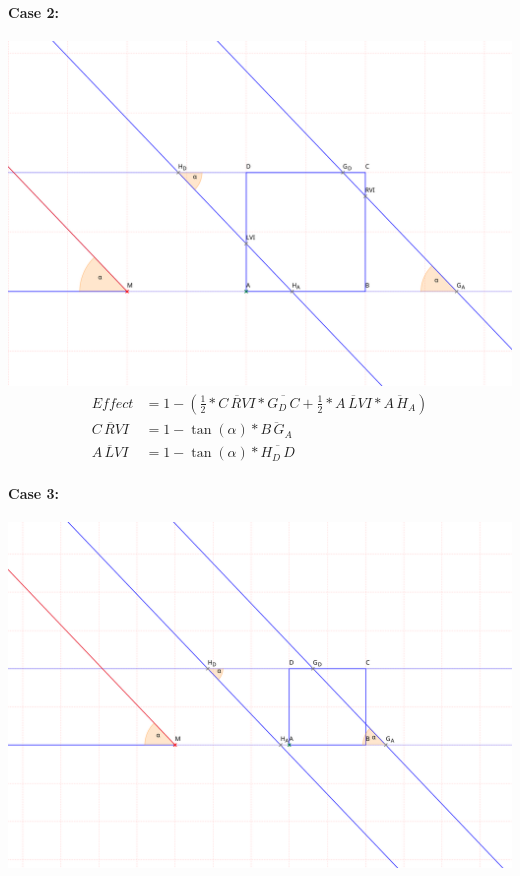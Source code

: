 \documentclass[a4paper,10pt,fleqn]{scrartcl}
\begin{document}
\paragraph{Case 2:}
\includegraphics[width=\textwidth]{case2}
\begin{align*}
Effect &= 1 - (\frac{1}{2} * \overline{C\,RVI} * \overline{G_D\,C} + \frac{1}{2} * \overline{A\,LVI} * \overline{A\,H_A})\\
\overline{C\,RVI} &=  1 - \tan(\alpha) * \overline{B\,G_A}\\
\overline{A\,LVI} &=  1 - \tan(\alpha) * \overline{H_D\,D}
\end{align*}
\paragraph{Case 3:}
\includegraphics[width=\textwidth]{case3}
\end{document}
